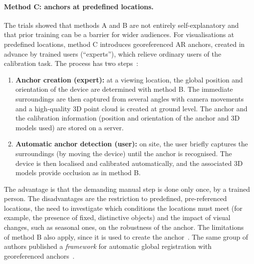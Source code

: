 \paragraph{Method C: anchors at predefined locations.}
\label{sec:ar4wind_metodoC}
The trials showed that methods A and B are not entirely self-explanatory and that prior training can be a barrier for wider audiences. For visualisations at predefined locations, method C introduces georeferenced AR anchors, created in advance by trained users (``experts''), which relieve ordinary users of the calibration task. The process has two steps~\cite[Sec.~2.2.2.4]{ar4wind2023}:

\begin{enumerate}
    \item \textbf{Anchor creation (expert):} at a viewing location, the global position and orientation of the device are determined with method B. The immediate surroundings are then captured from several angles with camera movements and a high-quality 3D point cloud is created at ground level. The anchor and the calibration information (position and orientation of the anchor and 3D models used) are stored on a server.
    \item \textbf{Automatic anchor detection (user):} on site, the user briefly captures the surroundings (by moving the device) until the anchor is recognised. The device is then localised and calibrated automatically, and the associated 3D models provide occlusion as in method B.
\end{enumerate}

The advantage is that the demanding manual step is done only once, by a trained person. The disadvantages are the restriction to predefined, pre-referenced locations, the need to investigate which conditions the locations must meet (for example, the presence of fixed, distinctive objects) and the impact of visual changes, such as seasonal ones, on the robustness of the anchor. The limitations of method B also apply, since it is used to create the anchor~\cite[Sec.~2.2.2.4]{ar4wind2023}. The same group of authors published a \textit{framework} for automatic global registration with georeferenced anchors~\cite{burkard2024anchors}.

